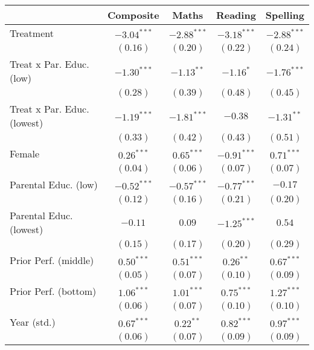 
\begin{table}
\begin{center}
\begin{tabular}{l c c c c}
\hline
 & Composite & Maths & Reading & Spelling \\
\hline
Treatment                   & $-3.04^{***}$ & $-2.88^{***}$ & $-3.18^{***}$ & $-2.88^{***}$ \\
                            & $(0.16)$      & $(0.20)$      & $(0.22)$      & $(0.24)$      \\
Treat x Par. Educ. (low)    & $-1.30^{***}$ & $-1.13^{**}$  & $-1.16^{*}$   & $-1.76^{***}$ \\
                            & $(0.28)$      & $(0.39)$      & $(0.48)$      & $(0.45)$      \\
Treat x Par. Educ. (lowest) & $-1.19^{***}$ & $-1.81^{***}$ & $-0.38$       & $-1.31^{**}$  \\
                            & $(0.33)$      & $(0.42)$      & $(0.43)$      & $(0.51)$      \\
Female                      & $0.26^{***}$  & $0.65^{***}$  & $-0.91^{***}$ & $0.71^{***}$  \\
                            & $(0.04)$      & $(0.06)$      & $(0.07)$      & $(0.07)$      \\
Parental Educ. (low)        & $-0.52^{***}$ & $-0.57^{***}$ & $-0.77^{***}$ & $-0.17$       \\
                            & $(0.12)$      & $(0.16)$      & $(0.21)$      & $(0.20)$      \\
Parental Educ. (lowest)     & $-0.11$       & $0.09$        & $-1.25^{***}$ & $0.54$        \\
                            & $(0.15)$      & $(0.17)$      & $(0.20)$      & $(0.29)$      \\
Prior Perf. (middle)        & $0.50^{***}$  & $0.51^{***}$  & $0.26^{**}$   & $0.67^{***}$  \\
                            & $(0.05)$      & $(0.07)$      & $(0.10)$      & $(0.09)$      \\
Prior Perf. (bottom)        & $1.06^{***}$  & $1.01^{***}$  & $0.75^{***}$  & $1.27^{***}$  \\
                            & $(0.06)$      & $(0.07)$      & $(0.10)$      & $(0.10)$      \\
Year (std.)                 & $0.67^{***}$  & $0.22^{**}$   & $0.82^{***}$  & $0.97^{***}$  \\
                            & $(0.06)$      & $(0.07)$      & $(0.09)$      & $(0.09)$      \\

\end{tabular}
\end{center}
\end{table}
